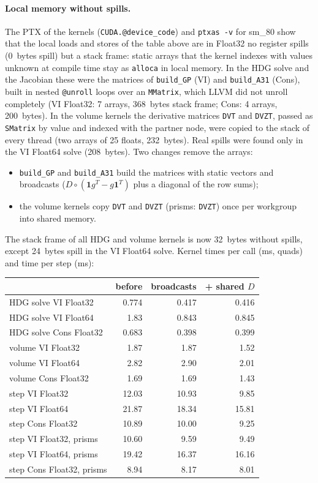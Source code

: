 \documentclass[11pt,a4paper]{article}
\newcommand{\code}[1]{\texttt{#1}}
\begin{document}
\paragraph{Local memory without spills.} The PTX of the kernels
(\code{CUDA.@device\_code}) and \code{ptxas -v} for sm\_80 show that the
local loads and stores of the table above are in Float32 no register
spills (0~bytes spill) but a stack frame: static arrays that the kernel
indexes with values unknown at compile time stay as \code{alloca} in
local memory. In the HDG solve and the Jacobian these were the matrices
of \code{build\_GP} (VI) and \code{build\_A31} (Cons), built in nested
\code{@unroll} loops over an \code{MMatrix}, which LLVM did not unroll
completely (VI Float32: 7 arrays, 368~bytes stack frame; Cons: 4 arrays,
200~bytes). In the volume kernels the derivative matrices \code{DVT} and
\code{DVZT}, passed as \code{SMatrix} by value and indexed with the
partner node, were copied to the stack of every thread (two arrays of
25 floats, 232~bytes). Real spills were found only in the VI Float64
solve (208~bytes). Two changes remove the arrays:
\begin{itemize}
\item \code{build\_GP} and \code{build\_A31} build the matrices with
  static vectors and broadcasts ($D\circ(\mathbf{1}g^T-g\mathbf{1}^T)$
  plus a diagonal of the row sums);
\item the volume kernels copy \code{DVT} and \code{DVZT} (prisms:
  \code{DVZT}) once per workgroup into shared memory.
\end{itemize}
The stack frame of all HDG and volume kernels is now 32~bytes without
spills, except 24~bytes spill in the VI Float64 solve. Kernel times per
call (ms, quads) and time per step (ms):
\begin{center}
\small
\begin{tabular}{lrrr}
\toprule
 & before & broadcasts & + shared $D$ \\
\midrule
HDG solve VI Float32        & 0.774 & 0.417 & 0.416 \\
HDG solve VI Float64        & 1.83  & 0.843 & 0.845 \\
HDG solve Cons Float32      & 0.683 & 0.398 & 0.399 \\
volume VI Float32           & 1.87  & 1.87  & 1.52 \\
volume VI Float64           & 2.82  & 2.90  & 2.01 \\
volume Cons Float32         & 1.69  & 1.69  & 1.43 \\
\midrule
step VI Float32             & 12.03 & 10.93 & 9.85 \\
step VI Float64             & 21.87 & 18.34 & 15.81 \\
step Cons Float32           & 10.89 & 10.00 & 9.25 \\
step VI Float32, prisms     & 10.60 & 9.59  & 9.49 \\
step VI Float64, prisms     & 19.42 & 16.37 & 16.16 \\
step Cons Float32, prisms   & 8.94  & 8.17  & 8.01 \\
\bottomrule
\end{tabular}
\end{center}
\end{document}
